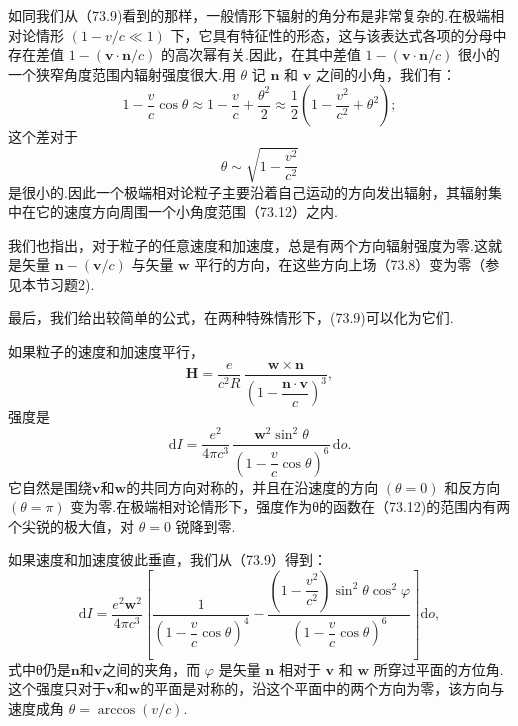 如同我们从（73.9)看到的那样，一般情形下辐射的角分布是非常复杂的.在极端相对论情形 $(1-v/c\ll 1)$ 下，它具有特征性的形态，这与该表达式各项的分母中存在差值 $1-(\boldsymbol{v}\cdot\boldsymbol{n}/c)$ 的高次幂有关.因此，在其中差值 $1-(\boldsymbol{v}\cdot\boldsymbol{n}/c)$ 很小的一个狭窄角度范围内辐射强度很大.用 $\theta$ 记 $\boldsymbol{n}$ 和 $\boldsymbol{v}$ 之间的小角，我们有：
\begin{equation*}
  1-\frac{v}{c}\cos\theta\approx 1-\frac{v}{c}+\frac{\theta^2}{2}
  \approx\frac{1}{2}\left(1-\frac{v^2}{c^2}+\theta^2\right);
\end{equation*}
这个差对于
\begin{equation}
  \theta\sim\sqrt{1-\frac{v^2}{c^2}}
\end{equation}
是很小的.因此一个极端相对论粒子主要沿着自己运动的方向发出辐射，其辐射集中在它的速度方向周围一个小角度范围（73.12）之内.

我们也指出，对于粒子的任意速度和加速度，总是有两个方向辐射强度为零.这就是矢量 $\boldsymbol{n}-(\boldsymbol{v}/c)$ 与矢量 $\boldsymbol{w}$ 平行的方向，在这些方向上场（73.8）变为零（参见本节习题2).

最后，我们给出较简单的公式，在两种特殊情形下，(73.9)可以化为它们.

如果粒子的速度和加速度平行，
\begin{equation*}
  \boldsymbol{H}=\frac{e}{c^2R}\,
  \frac{\boldsymbol{w}\times\boldsymbol{n}}{\left(1-\dfrac{\boldsymbol{n}\cdot\boldsymbol{v}}{c}\right)^3},
\end{equation*}
强度是
\begin{equation}
  \mathrm{d}I=\frac{e^2}{4\pi c^3}\,
  \frac{\boldsymbol{w}^2\sin^2\theta}{\left(1-\dfrac{v}{c}\cos\theta\right)^6}\,\mathrm{d}o.
\end{equation}
它自然是围绕$\boldsymbol{v}$和$\boldsymbol{w}$的共同方向对称的，并且在沿速度的方向 $(\theta=0)$ 和反方向 $(\theta=\pi)$ 变为零.在极端相对论情形下，强度作为θ的函数在（73.12)的范围内有两个尖锐的极大值，对 $\theta=0$ 锐降到零.

如果速度和加速度彼此垂直，我们从（73.9）得到：
\begin{equation}
  \mathrm{d}I=\frac{e^2\boldsymbol{w}^2}{4\pi c^3}\left[
  \frac{1}{\left(1-\dfrac{v}{c}\cos\theta\right)^4}
  -\frac{\left(1-\dfrac{v^2}{c^2}\right)\sin^2\theta\cos^2\varphi}{\left(1-\dfrac{v}{c}\cos\theta\right)^6}\right]\mathrm{d}o,
\end{equation}
式中θ仍是$\boldsymbol{n}$和$\boldsymbol{v}$之间的夹角，而 $\varphi$ 是矢量 $\boldsymbol{n}$ 相对于 $\boldsymbol{v}$ 和 $\boldsymbol{w}$ 所穿过平面的方位角.这个强度只对于$\boldsymbol{v}$和$\boldsymbol{w}$的平面是对称的，沿这个平面中的两个方向为零，该方向与速度成角 $\theta=\arccos(v/c)$.

